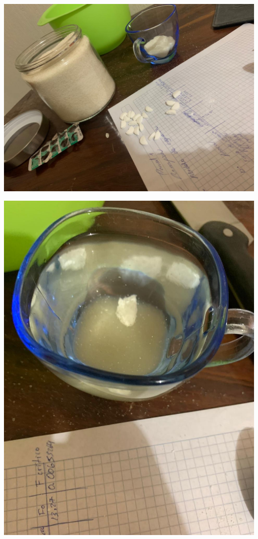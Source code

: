 \documentclass[a4paper,12pt]{article}
\begin{document}
\begin{center}
    \includegraphics[scale=0.2]{Imagenes/1.JPG}
\end{center}
\begin{center}
    \includegraphics[scale=0.2]{Imagenes/2.JPG}
\end{center}
\end{document}
